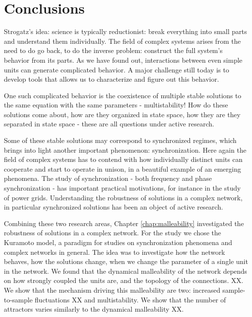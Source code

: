 \chapter{Conclusions}\label{chap:conclusions}

Strogatz's idea: science is typically reductionist: break everything into small parts and understand them individually. The field of complex systems arises from the need to do go back, to do the inverse problem: construct the full system's behavior from its parts. As we have found out, interactions between even simple units can generate complicated behavior. A major challenge still today is to develop tools that allows us to characterize and figure out this behavior.

One such complicated behavior is the coexistence of multiple stable solutions to the same equation with the same parameters - multistability! How do these solutions come about, how are they organized in state space, how they are they separated in state space - these are all questions under active research. 

Some of these stable solutions may correspond to synchronized regimes, which brings into light another important phenomenon: synchronization. Here again the field of complex systems has to contend with how individually distinct units can cooperate and start to operate in unison, in a beautiful example of an emerging phenomena. The study of synchronization - both frequency and phase synchronization - has important practical motivations, for instance in the study of power grids. Understanding the robustness of solutions in a complex network, in particular synchronized solutions has been an object of active research. 


Combining these two research areas, Chapter \ref{chap:malleability} investigated the robustness of solutions in a complex network. For the study we chose the Kuramoto model, a paradigm for studies on synchronization phenomena and complex networks in general. The idea was to investigate how the network behaves, how the solutions change, when we change the parameter of a single unit in the network. We found that the dynamical malleability of the network depends on how strongly coupled the units are, and the topology of the connections. XX. We show that the mechanism driving this malleability are two: increased sample-to-sample fluctuations XX and multistability. We show that the number of attractors varies similarly to the dynamical malleability XX.

